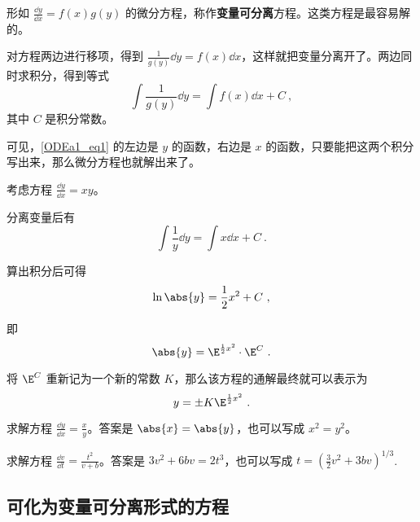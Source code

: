 

形如 $\frac{\dd y}{\dd x}=f(x)g(y)$ 的微分方程，称作\textbf{变量可分离}方程。这类方程是最容易解的。

对方程两边进行移项，得到 $\frac{1}{g(y)}\dd y=f(x)\dd x$，这样就把变量分离开了。两边同时求积分，得到等式
\begin{equation}\label{ODEa1_eq1}
\int\frac{1}{g(y)}\dd y=\int f(x)\dd x+C~,
\end{equation}
其中 $C$ 是积分常数。

可见，\autoref{ODEa1_eq1} 的左边是 $y$ 的函数，右边是 $x$ 的函数，只要能把这两个积分写出来，那么微分方程也就解出来了。

\begin{example}{}
考虑方程 $\frac{\dd y}{\dd x}=xy$。

分离变量后有
\begin{equation}
\int\frac{1}{y}\dd y=\int x\dd x+C~.
\end{equation}

算出积分后可得
\begin{equation}
\ln\abs{y}=\frac{1}{2}x^2+C~,
\end{equation}

即
\begin{equation}
\abs{y}=\E^{\frac{1}{2}x^2}\cdot\E^C~.
\end{equation}

将 $\E^C$ 重新记为一个新的常数 $K$，那么该方程的通解最终就可以表示为
\begin{equation}
y=\pm K\E^{\frac{1}{2}x^2}~.
\end{equation}
\end{example}

\begin{exercise}{}
求解方程 $\frac{\dd y}{\dd x}=\frac{x}{y}$。答案是 $\abs{x}=\abs{y}$，也可以写成 $x^2=y^2$。
\end{exercise}

\begin{exercise}{}
求解方程 $\frac{\dd v}{\dd t}=\frac{t^2}{v+b}$。答案是 $3v^2+6bv=2t^3$，也可以写成 $t=(\frac{3}{2}v^2+3bv)^{1/3}$.
\end{exercise}

\subsection{可化为变量可分离形式的方程}

